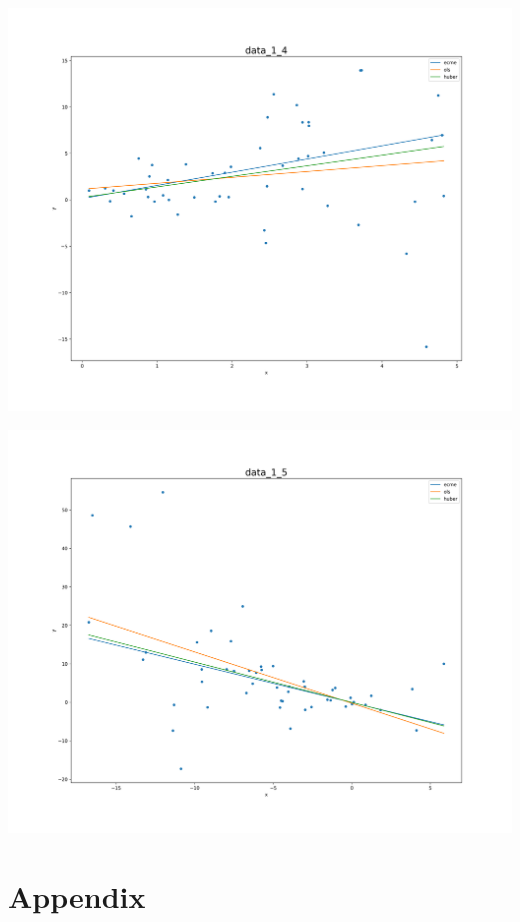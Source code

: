 \documentclass[11pt, a4 paper]{article}
\begin{document}
\begin{minipage}{.5\textwidth}
\includegraphics[scale=0.25]{data_1_4-figure.png}
\end{minipage}%
\begin{minipage}{.5\textwidth}
\includegraphics[scale=0.25]{data_1_5-figure.png}
\end{minipage}


\section*{Appendix}
\appendix
\end{document}
